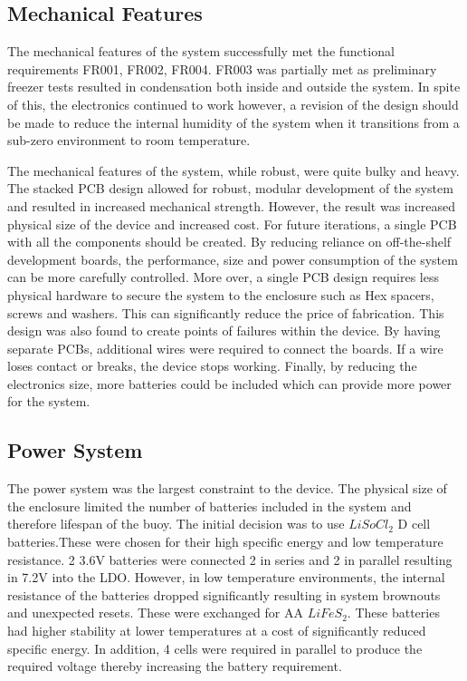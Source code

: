 \subsection{Mechanical Features}

The mechanical features of the system successfully met the functional requirements FR001, FR002, FR004. FR003 was partially met as preliminary freezer tests resulted in condensation both inside and outside the system. In spite of this, the electronics continued to work however, a revision of the design should be made to reduce the internal humidity of the system when it transitions from a sub-zero environment to room temperature. \par 

The mechanical features of the system, while robust, were quite bulky and heavy. The stacked PCB design allowed for robust, modular development of the system and resulted in increased mechanical strength. However, the result was increased physical size of the device and increased cost. For future iterations, a single PCB with all the components should be created. By reducing reliance on off-the-shelf development boards, the performance, size and power consumption of the system can be more carefully controlled. More over, a single PCB design requires less physical hardware to secure the system to the enclosure such as Hex spacers, screws and washers. This can significantly reduce the price of fabrication. This design was also found to create points of failures within the device. By having separate PCBs, additional wires were required to connect the boards. If a wire loses contact or breaks, the device stops working. Finally, by reducing the electronics size, more batteries could be included which can provide more power for the system.

\subsection{Power System}

The power system was the largest constraint to the device. The physical size of the enclosure limited the number of batteries included in the system and therefore lifespan of the buoy. The initial decision was to use $LiSoCl_2$ D cell batteries.These were chosen for their high specific energy and low temperature resistance. 2 3.6V batteries were connected 2 in series and 2 in parallel resulting in 7.2V into the LDO. However, in low temperature environments, the internal resistance of the batteries dropped significantly resulting in system brownouts and unexpected resets. These were exchanged for AA $LiFeS_2$. These batteries had higher stability at lower temperatures at a cost of significantly reduced specific energy. In addition, 4 cells were required in parallel to produce the required voltage thereby increasing the battery requirement.\par 

